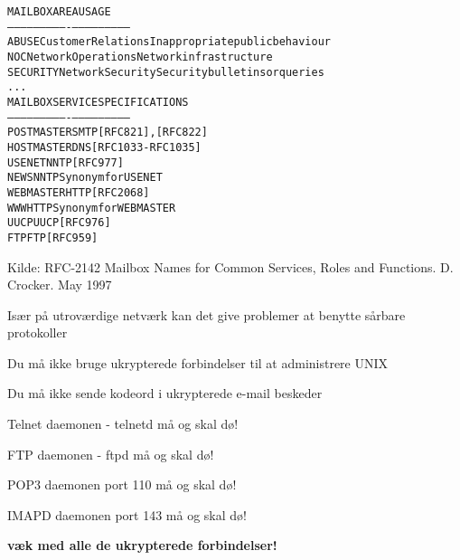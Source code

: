 
\begin{alltt}
MAILBOX       AREA                USAGE
-----------   ----------------    ---------------------------
ABUSE         Customer Relations  Inappropriate public behaviour
NOC           Network Operations  Network infrastructure
SECURITY      Network Security    Security bulletins or queries  
...
MAILBOX       SERVICE             SPECIFICATIONS
-----------   ----------------    ---------------------------
POSTMASTER    SMTP                [RFC821], [RFC822]
HOSTMASTER    DNS                 [RFC1033-RFC1035]
USENET        NNTP                [RFC977]
NEWS          NNTP                Synonym for USENET
WEBMASTER     HTTP                [RFC 2068]
WWW           HTTP                Synonym for WEBMASTER
UUCP          UUCP                [RFC976]
FTP           FTP                 [RFC959]
\end{alltt}

Kilde: 
RFC-2142 Mailbox Names for Common Services, Roles and Functions. D.
Crocker. May 1997



\begin{list1}
\item Især på utroværdige netværk kan det give problemer at benytte
  sårbare protokoller   
\end{list1}


\begin{list1}
\item Du må ikke bruge ukrypterede forbindelser til at administrere
  UNIX
\item Du må ikke sende kodeord i ukrypterede e-mail beskeder  
\end{list1}

\centerline{\hlkbig Telnet daemonen - telnetd må og skal dø!}

\pause
\centerline{\hlkbig FTP daemonen - ftpd må og skal dø!}

\pause
\centerline{\hlkbig POP3 daemonen port 110 må og skal dø!}

\pause
\centerline{\hlkbig IMAPD daemonen port 143 må og skal dø!}

\pause
\vskip 1cm 
\centerline{\hlkbig\bf væk med alle de ukrypterede forbindelser!}



